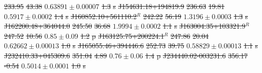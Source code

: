 \documentclass[11pt, a4paper]{book}
\providecommand{\DIFdeltex}[1]{{\protect\color{red}\sout{#1}}}                      %
\providecommand{\DIFdelFL}[1]{\DIFdel{#1}} %
\providecommand{\DIFdel}[1]{\texorpdfstring{\DIFdeltex{#1}}{}} %
\begin{document}
\DIFdelFL{233.95 }%
\DIFdelFL{43.38 }%
\DIFdelFL{$0.63891 \pm 0.00007$ }%
\DIFdelFL{1.3 }%
\DIFdelFL{s}%
    \DIFdelFL{J154631.18+194819.9 }%
\DIFdelFL{236.63 }%
\DIFdelFL{19.81 }%
\DIFdelFL{$0.5917 \pm 0.0002$ }%
\DIFdelFL{1.4 }%
\DIFdelFL{s}%
    \DIFdelFL{J160852.10+561110.2${}^R$ }%
\DIFdelFL{242.22 }%
\DIFdelFL{56.19 }%
\DIFdelFL{$1.3196 \pm 0.0003$ }%
\DIFdelFL{1.3 }%
\DIFdelFL{s}%
    \DIFdelFL{J162200.48+364044.0 }%
\DIFdelFL{245.50 }%
\DIFdelFL{36.68 }%
\DIFdelFL{$1.9994 \pm 0.0002$ }%
\DIFdelFL{1.1 }%
\DIFdelFL{s}%
    \DIFdelFL{J163004.35+103321.9${}^R$ }%
\DIFdelFL{247.52 }%
\DIFdelFL{10.56 }%
\DIFdelFL{$0.85 \pm 0.09$ }%
\DIFdelFL{1.2 }%
\DIFdelFL{p}%
    \DIFdelFL{J163125.75+200224.1${}^R$ }%
\DIFdelFL{247.86 }%
\DIFdelFL{20.04 }%
\DIFdelFL{$0.62662 \pm 0.00013$ }%
\DIFdelFL{1.0 }%
\DIFdelFL{s}%
    \DIFdelFL{J165055.46+394446.6 }%
\DIFdelFL{252.73 }%
\DIFdelFL{39.75 }%
\DIFdelFL{$0.58829 \pm 0.00013$ }%
\DIFdelFL{1.1 }%
\DIFdelFL{s}%
    \DIFdelFL{J232410.33+045309.6 }%
\DIFdelFL{351.04 }%
\DIFdelFL{4.89 }%
\DIFdelFL{$0.76 \pm 0.06$ }%
\DIFdelFL{1.4 }%
\DIFdelFL{p}%
    \DIFdelFL{J234440.02-003231.6 }%
\DIFdelFL{356.17 }%
\DIFdelFL{-0.54 }%
\DIFdelFL{$0.5014 \pm 0.0001$ }%
\DIFdelFL{1.0 }%
\DIFdelFL{s}%
\end{document}
